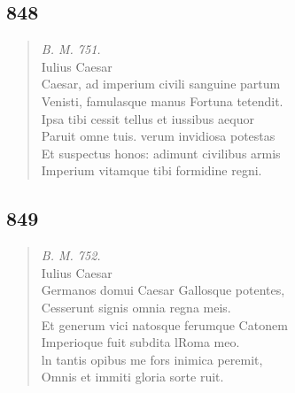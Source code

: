 \documentclass[11pt, a4paper]{report}
\begin{document}
            \subsection*{848}
      \begin{verse}
      \textit{B. M. 751.} \\  \lbrack Iulius Caesar \\ Caesar, ad imperium civili sanguine partum \\ Venisti, famulasque manus Fortuna tetendit. \\ Ipsa tibi cessit tellus et iussibus aequor \\ Paruit omne tuis. verum invidiosa potestas \\ Et suspectus honos: adimunt civilibus armis \\ Imperium vitamque tibi formidine regni. \\ 
      \end{verse}
  
            \subsection*{849}
      \begin{verse}
      \textit{B. M. 752.} \\ Iulius Caesar \\ Germanos domui Caesar Gallosque potentes, \\ Cesserunt signis omnia regna meis. \\ Et generum vici natosque ferumque Catonem \\ Imperioque fuit subdita lRoma meo. \\ ln tantis opibus me fors inimica peremit, \\ Omnis et immiti gloria sorte ruit. \\ 
      \end{verse}
  
\end{document}
